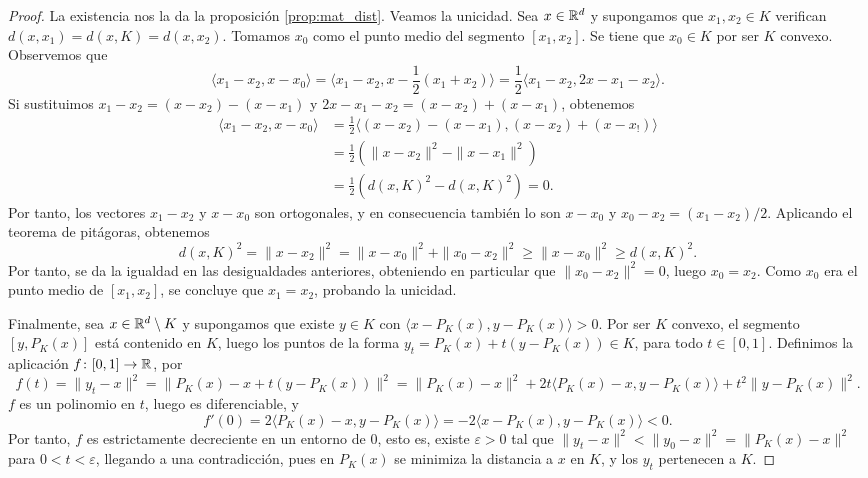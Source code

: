 \begin{proof}
    La existencia nos la da la proposición \ref{prop:mat_dist}. Veamos la unicidad. Sea $x \in \mathbb{R}^d$ y supongamos que $x_1,x_2 \in K$ verifican $d(x,x_1) = d(x,K) = d(x,x_2)$. Tomamos $x_0$ como el punto medio del segmento $[x_1,x_2]$. Se tiene que $x_0 \in K$ por ser $K$ convexo. Observemos que
    \[\langle x_1 - x_2, x - x_0 \rangle = \langle x_1 - x_2, x - \frac{1}{2}(x_1 + x_2) \rangle = \frac{1}{2}\langle x_1 - x_2, 2x - x_1 - x_2 \rangle.\]
    Si sustituimos $x_1 - x_2 = (x - x_2) - (x - x_1)$ y $2x - x_1 - x_2 = (x-x_2)+(x-x_1)$, obtenemos
    \begin{align*}
        \langle x_1 - x_2, x - x_0 \rangle &= \frac{1}{2} \langle (x - x_2) - (x-x_1), (x - x_2)+(x - x_!) \rangle\\
                                           &= \frac{1}{2}(\|x - x_2\|^2 - \|x - x_1\|^2) \\
                                           &= \frac{1}{2}(d(x,K)^2 - d(x,K)^2) = 0.
    \end{align*}
    Por tanto, los vectores $x_1 - x_2$ y $x - x_0$ son ortogonales, y en consecuencia también lo son $x - x_0$ y $x_0 - x_2 = (x_1 - x_2)/2$. Aplicando el teorema de pitágoras, obtenemos
    \[d(x,K)^2 = \|x - x_2\|^2 =  \|x - x_0\|^2 + \|x_0 - x_2\|^2 \ge \|x - x_0\|^2 \ge d(x,K)^2.\]
    Por tanto, se da la igualdad en las desigualdades anteriores, obteniendo en particular que $\|x_0 - x_2\|^2 = 0$, luego $x_0 = x_2$. Como $x_0$ era el punto medio de $[x_1,x_2]$, se concluye que $x_1 = x_2$, probando la unicidad.

    Finalmente, sea $x \in \mathbb{R}^d \setminus K$ y supongamos que existe $y \in K$ con $\langle x - P_K(x), y - P_K(x) \rangle > 0$. Por ser $K$ convexo, el segmento $[y,P_K(x)]$ está contenido en $K$, luego los puntos de la forma $y_t = P_K(x) + t(y - P_K(x)) \in K$, para todo $t \in [0,1]$. Definimos la aplicación $f \colon [0,1] \to \mathbb{R}$, por
    \[f(t) = \|y_t - x\|^2 = \|P_K(x) -x  + t(y - P_K(x))\|^2 = \|P_K(x) - x \|^2 + 2t\langle P_K(x)-x,y-P_K(x) \rangle + t^2\|y - P_K(x)\|^2. \]
    $f$ es un polinomio en $t$, luego es diferenciable, y
    \[f'(0) = 2\langle P_K(x)-x,y-P_K(x) \rangle = -2 \langle x - P_K(x), y - P_K(x) \rangle < 0.\]
    Por tanto, $f$ es estrictamente decreciente en un entorno de 0, esto es, existe $\varepsilon > 0$ tal que $\|y_t - x\|^2 < \|y_0 - x \|^2 = \|P_K(x) - x\|^2$ para $0 < t < \varepsilon$, llegando a una contradicción, pues en $P_K(x)$ se minimiza la distancia a $x$ en $K$, y los $y_t$ pertenecen a $K$.
\end{proof}

